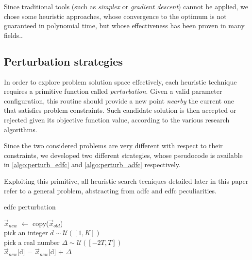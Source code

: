 \documentclass[12pt,journal,draftclsnofoot,onecolumn]{IEEEtran}
\begin{document}
Since traditional tools (such as \emph{simplex} or \emph{gradient descent}) cannot be applied, we chose some heuristic approaches, whose convergence to the optimum is not guaranteed in polynomial time, but whose effectiveness has been proven in many fields.\cite{Edelkamp2010}.

\subsection{Perturbation strategies} \label{sec:perturbations}
In order to explore problem solution space effectively, each heuristic technique requires a primitive function called \emph{perturbation}.
Given a valid parameter configuration, this routine should provide a new point \emph{nearby} the current one that satisfies problem constraints.
Such candidate solution is then accepted or rejected given its objective function value, according to the various research algorithms.

\smallbreak
Since the two considered problems are very different with respect to their constraints, we developed two different strategies, whose pseudocode is available in \autoref{algo:perturb_edfc} and \autoref{algo:perturb_adfc} respectively.

Exploiting this primitive, all heuristic search tecniques detailed later in this paper refer to a general problem, abstracting from \gls{adfc} and \gls{edfc} peculiarities.

\clearpage
\begin{algorithm}[htp]
\caption{\gls{edfc} perturbation} \label{algo:perturb_edfc}

	 {
		$\vec{x}_{new}$ $\gets$ copy($\vec{x}_{old}$) \\
		pick an integer $d \sim \mathcal{U}([1, K])$ \\
		pick a real number $\Delta \sim \mathcal{U}([-2T, T])$ \\
		$\vec{x}_{new}$[d] = $\vec{x}_{new}$[d] + $\Delta$
	}
\end{algorithm}
\end{document}
